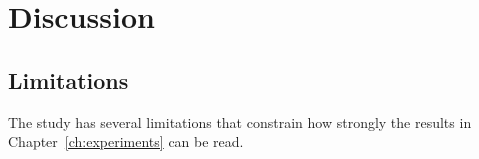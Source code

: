 \chapter{Discussion}
\label{ch:discussion}


\section{Limitations}
\label{sec:limitations}

The study has several limitations that constrain how strongly the results in Chapter~\ref{ch:experiments} can be read.

